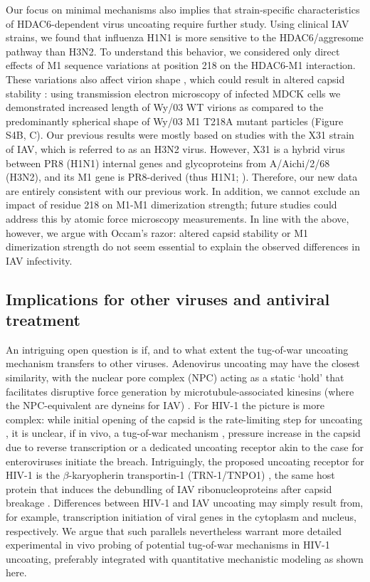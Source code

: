 Our focus on minimal mechanisms also implies that strain-specific characteristics of HDAC6-dependent virus uncoating require further study. Using clinical IAV strains, we found that influenza H1N1 is more sensitive to the HDAC6/aggresome pathway than H3N2. To understand this behavior, we considered only direct effects of M1 sequence variations at position 218 on the HDAC6-M1 interaction. These variations also affect virion shape \cite{elleman2004m1}, which could result in altered capsid stability \cite{dadonaite2016filamentous}: using transmission electron microscopy of infected MDCK cells we demonstrated increased length of Wy/03 WT virions as compared to the predominantly spherical shape of Wy/03 M1 T218A mutant particles (Figure S4B, C). Our previous results \cite{banerjee2014influenza} were mostly based on studies with the X31 strain of IAV, which is referred to as an H3N2 virus. However, X31 is a hybrid virus between PR8 (H1N1) internal genes and glycoproteins from A/Aichi/2/68  (H3N2), and its M1 gene is PR8-derived (thus H1N1; \cite{banerjee2013high}). Therefore, our new data are entirely consistent with our previous work. In addition, we cannot exclude an impact of residue 218 on M1-M1 dimerization strength; future studies could address this by atomic force microscopy measurements. In line with the above, however, we argue with Occam’s razor: altered capsid stability or M1 dimerization strength do not seem essential to explain the observed differences in IAV infectivity.

\subsection{Implications for other viruses and antiviral treatment}

An intriguing open question is if, and to what extent the tug-of-war uncoating mechanism transfers to other viruses. Adenovirus uncoating may have the closest similarity, with the nuclear pore complex (NPC) acting as a static ‘hold’ that facilitates disruptive force generation by microtubule-associated kinesins (where the NPC-equivalent are dyneins for IAV) \cite{flatt2019adenovirus,greber2019adenovirus}. For HIV-1 the picture is more complex: while initial opening of the capsid is the rate-limiting step for uncoating \cite{marquez2018kinetics}, it is unclear, if in vivo, a tug-of-war mechanism \cite{rawle2018toward}, pressure increase in the capsid due to reverse transcription \cite{rankovic2017reverse} or a dedicated uncoating receptor akin to the case for enteroviruses \cite{zhao2019human} initiate the breach. Intriguingly, the proposed uncoating receptor for HIV-1 is the $\beta$-karyopherin transportin-1 (TRN-1/TNPO1) \cite{fernandez2019transportin}, the same host protein that induces the debundling of IAV ribonucleoproteins after capsid breakage \cite{miyake2019influenza, yamauchi2020influenza}. Differences between HIV-1 and IAV uncoating may simply result from, for example, transcription initiation of viral genes in the cytoplasm and nucleus, respectively. We argue that such parallels nevertheless warrant more detailed experimental in vivo probing of potential tug-of-war mechanisms in HIV-1 uncoating, preferably integrated with quantitative mechanistic modeling as shown here.

